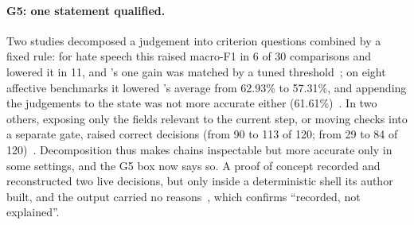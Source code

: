 \paragraph{G5: one statement qualified.}
Two studies decomposed a judgement into criterion questions combined by a fixed rule: for hate speech this raised macro-F1 in 6 of 30 comparisons and lowered it in 11, and \jev{}'s one gain was matched by a tuned threshold~\cite{arx03324}; on eight affective benchmarks it lowered \jev{}'s average from 62.93\% to 57.31\%, and appending the judgements to the state was not more accurate either (61.61\%)~\cite{arx08829}.
In two others, exposing only the fields relevant to the current step, or moving checks into a separate gate, raised correct decisions (from 90 to 113 of 120; from 29 to 84 of 120)~\cite{arx07327,arx06425}.
Decomposition thus makes chains inspectable but more accurate only in some settings, and the G5 box now says so.
A proof of concept recorded and reconstructed two live decisions, but only inside a deterministic shell its author built, and the output carried no reasons~\cite{zen23189584}\zmark{}, which confirms ``recorded, not explained''.

